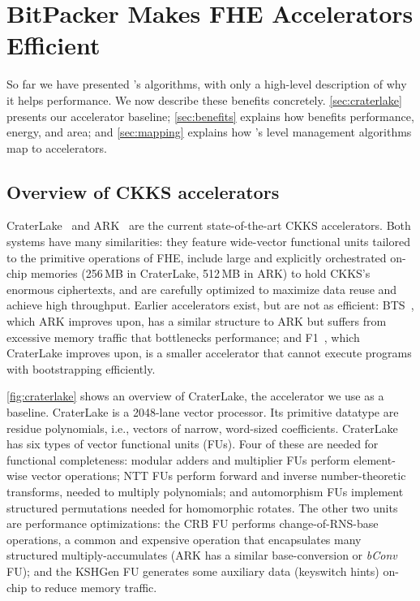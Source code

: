 \section{BitPacker Makes FHE Accelerators Efficient}
\label{sec:implementation}

\figCraterLake

So far we have presented \name's algorithms, with only a high-level description
of why it helps performance.
We now describe these benefits concretely.
\autoref{sec:craterlake} presents our accelerator baseline;
\autoref{sec:benefits} explains how \name benefits performance, energy, and
area; and \autoref{sec:mapping} explains how \name's level management
algorithms map to accelerators.

\subsection{Overview of CKKS accelerators}
\label{sec:craterlake}
\label{sec:accelerators}

CraterLake~\cite{samardzic:isca22:craterlake} and ARK~\cite{kim2022ark} are
the current state-of-the-art CKKS accelerators.
Both systems have many similarities: they feature wide-vector functional units
tailored to the primitive operations of FHE, include large and explicitly
orchestrated on-chip memories (256\,MB in CraterLake, 512\,MB in ARK) to hold
CKKS's enormous ciphertexts, and are carefully optimized to maximize data reuse
and achieve high throughput.
Earlier accelerators exist, but are not as efficient:
BTS~\cite{kim:isca22:bts}, which ARK improves upon, has a similar structure to
ARK but suffers from excessive memory traffic that bottlenecks performance; and
F1~\cite{feldmann:micro21:f1}, which CraterLake improves upon, is a smaller
accelerator that cannot execute programs with bootstrapping efficiently.

\autoref{fig:craterlake} shows an overview of CraterLake, the accelerator we
use as a baseline.
CraterLake is a 2048-lane vector processor.
Its primitive datatype are residue polynomials, i.e., vectors of narrow,
word-sized coefficients.
CraterLake has six types of vector functional units (FUs).
Four of these are needed for functional completeness:
modular adders and multiplier FUs perform element-wise vector operations;
NTT FUs perform forward and inverse number-theoretic transforms,
needed to multiply polynomials;
and automorphism FUs implement structured permutations needed for homomorphic
rotates.
The other two units are performance optimizations:
the CRB FU performs change-of-RNS-base operations, a common and expensive
operation that encapsulates many structured multiply-accumulates (ARK has a
similar base-conversion or \emph{bConv} FU);
and the KSHGen FU generates some auxiliary data (keyswitch hints) on-chip to
reduce memory traffic.

